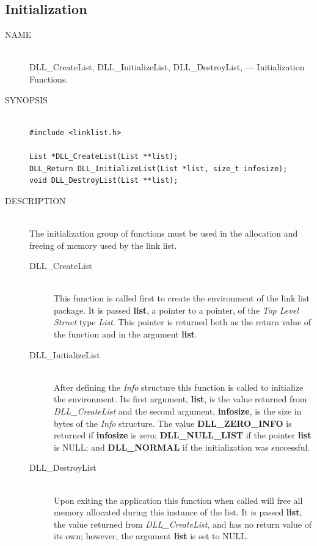 \documentclass[10pt,letterpaper,titlepage]{article}
\begin{document}
\subsection{Initialization}
\begin{description}
\item[NAME]\quad\\
DLL\_CreateList, DLL\_InitializeList, DLL\_DestroyList, --- Initialization Functions.

\item[SYNOPSIS]
\begin{verbatim}

#include <linklist.h>

List *DLL_CreateList(List **list);
DLL_Return DLL_InitializeList(List *list, size_t infosize);
void DLL_DestroyList(List **list);
\end{verbatim}

\item[DESCRIPTION]\quad\\
The initialization group of functions must be used in the allocation and freeing of memory used by the link list.

 \begin{description}
 \item[DLL\_CreateList]\quad\\
 This function is called first to create the environment of the link list package.  It is passed \textbf{list}, a pointer to a pointer, of the \emph{Top Level Struct} type \emph{List}.  This pointer is returned both as the return value of the function and in the argument \textbf{list}.

 \item[DLL\_InitializeList]\quad\\
 After defining the \emph{Info} structure this function is called to initialize the environment.  Its first argument, \textbf{list}, is the value returned from \emph{DLL\_CreateList} and the second argument, \textbf{infosize}, is the size in bytes of the \emph{Info} structure.  The value \textbf{DLL\_ZERO\_INFO} is returned if \textbf{infosize} is zero; \textbf{DLL\_NULL\_LIST} if the pointer \textbf{list} is NULL; and \textbf{DLL\_NORMAL} if the initialization was successful.

 \item[DLL\_DestroyList]\quad\\
 Upon exiting the application this function when called will free all memory allocated during this instance of the list.  It is passed \textbf{list}, the value returned from \emph{DLL\_CreateList}, and has no return value of its own; however, the argument \textbf{list} is set to NULL.
 \end{description}


\end{description}
\end{document}
